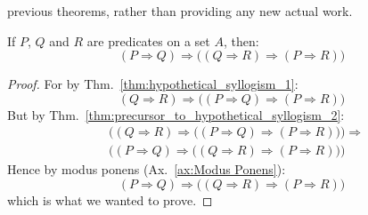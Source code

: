     previous theorems, rather than providing any new actual work.
    \begin{theorem}
        \label{thm:hypothetical_syllogism_2}%
        If $P$, $Q$ and $R$ are predicates on a set $A$, then:
        \begin{equation*}
            (P\Rightarrow{Q})\Rightarrow
            \big(
                (Q\Rightarrow{R})\Rightarrow(P\Rightarrow{R})
            \big)
        \end{equation*}
    \end{theorem}
    \begin{proof}
        For by Thm.~\ref{thm:hypothetical_syllogism_1}:
        \begin{equation}
            (Q\Rightarrow{R})\Rightarrow
            \big(
                (P\Rightarrow{Q})\Rightarrow(P\Rightarrow{R})
            \big)
        \end{equation}
        But by Thm.~\ref{thm:precursor_to_hypothetical_syllogism_2}:
        \begin{equation}
            \begin{split}
                &
                \Big(
                    (Q\Rightarrow{R})\Rightarrow
                    \big(
                        (P\Rightarrow{Q})\Rightarrow(P\Rightarrow{R})
                    \big)
                \Big)
                \Rightarrow\\
                &
                \Big(
                    (P\Rightarrow{Q})\Rightarrow
                    \big(
                        (Q\Rightarrow{R})\Rightarrow(P\Rightarrow{R})
                    \big)
                \Big)
            \end{split}
        \end{equation}
        Hence by modus ponens (Ax.~\ref{ax:Modus Ponens}):
        \begin{equation}
            (P\Rightarrow{Q})\Rightarrow
            \big(
                (Q\Rightarrow{R})\Rightarrow(P\Rightarrow{R})
            \big)
        \end{equation}
        which is what we wanted to prove.
    \end{proof}
